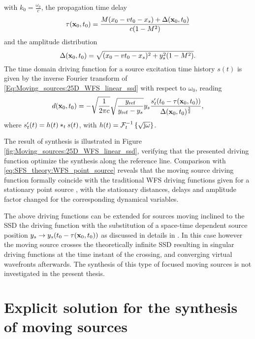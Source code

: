 with $k_0 = \frac{\omega_0}{c}$, the propagation time delay
\begin{equation}
\tau(\mathbf{x}_0,t_0) = \frac{M (x_0 - v t_0 - x_s )+\Delta(\mathbf{x}_0,t_0)}{c (1-M^2)} 
\end{equation}
and the amplitude distribution
\begin{equation}
\Delta(\mathbf{x}_0,t_0) = \sqrt{(x_0 - v t_0 - x_s)^2 + y_s^2(1-M^2)}.
\end{equation}
The time domain driving function for a source excitation time history $s(t)$ is given by the inverse Fourier transform of \eqref{Eq:Moving_sources:25D_WFS_linear_ssd} with respect to $\omega_0$, reading 
\begin{equation}
d(\mathbf{x}_0,t_0) = -
\sqrt{\frac{ 1 }{2\pi c} }
\sqrt{\frac{ y_{\mathrm{ref}} }{y_{\mathrm{ref}}-y_s}}
y_s
\frac{s^{\nshortmid}_t(t_0 - \tau( \mathbf{x}_0,t_0 ))}{\Delta(\mathbf{x}_0,t_0)^{\frac{3}{2}}},
\label{Eq:Moving_sources:25D_WFS_linear_ssd_td}
\end{equation}
where $s^{\nshortmid}_t(t) = h(t) \ast_{t} s(t)$, with $h(t) = \mathcal{F}^{-1}_t\left\{ \sqrt{\mathrm{j} \omega} \right\}$.

The result of synthesis is illustrated in Figure \eqref{fig:Moving_sources:25D_WFS_linear_ssd}, verifying that the presented driving function optimize the synthesis along the reference line.
Comparison with \eqref{eq:SFS_theory:WFS_point_source} reveals that the moving source driving function formally coincide with the traditional WFS driving functions given for a stationary point source \cite[(2.27)]{Verheijen1997:phd}, \cite[(3.16)\&(3.17)]{Start1997:phd} with the stationary distances, delays and amplitude factor changed for the corresponding dynamical variables.

The above driving functions can be extended for sources moving inclined to the SSD the driving function with the substitution of a space-time dependent source position $y_s \rightarrow y_s(t_0 - \tau(\mathbf{x}_0,t_0))$ as discussed in details in \cite{firtha2016wave}.
In this case however the moving source crosses the theoretically infinite SSD resulting in singular driving functions at the time instant of the crossing, and converging virtual wavefronts afterwards.
The synthesis of this type of focused moving sources is not investigated in the present thesis.

\section{Explicit solution for the synthesis of moving sources}

